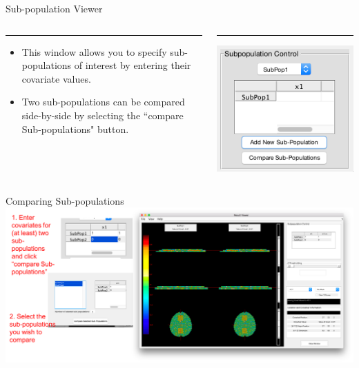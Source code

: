 \documentclass[11pt]{beamer}
\begin{document}
\begin{frame}{Sub-population Viewer}
\begin{columns}[T] %
	\begin{column}{.4\textwidth}
		\color{black}\rule{\linewidth}{0pt}

\begin{itemize}	
\item This window allows you to specify sub-populations of interest by entering their covariate values. 
\item Two sub-populations can be compared side-by-side by selecting the ``compare Sub-populations" button.
\end{itemize}
		
	\end{column}%
	\hfill%
	\begin{column}{.6\textwidth}
		\color{blue}\rule{\linewidth}{0pt}
				\includegraphics[width=1\linewidth]{figs/viewerSubpopControl}
	\end{column}%
\end{columns}
\end{frame}

\begin{frame}{Comparing Sub-populations}
		\includegraphics[width=1\linewidth]{figs/subPopCompareEx}
\end{frame}
\end{document}

